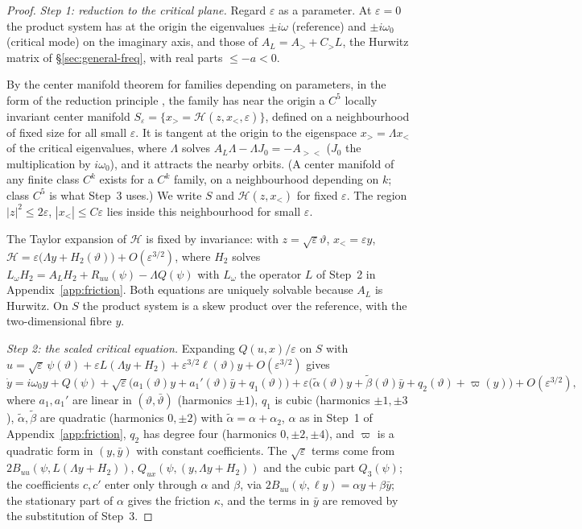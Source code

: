 \documentclass[11pt,reqno]{amsart}
\theoremstyle{plain}
\theoremstyle{definition}
\theoremstyle{remark}
\begin{document}
\begin{proof}
\emph{Step 1: reduction to the critical plane.} Regard $\varepsilon$ as a parameter. At $\varepsilon=0$ the product system has at the
origin the eigenvalues $\pm i\omega$ (reference) and $\pm i\omega_0$ (critical mode) on the imaginary axis, and those of $A_L=A_>+C_>L$, the Hurwitz matrix of \S\ref{sec:general-freq}, with
real parts $\le-a<0$.

By the center manifold theorem for families depending on parameters, in the form of the reduction
principle \cite{Shosh1972,Shosh1975reduction}, the family has near the origin a $C^{5}$ locally invariant center manifold
$S_\varepsilon=\{x_>=\mathcal H(z,x_<,\varepsilon)\}$, defined on a neighbourhood of fixed size for all small $\varepsilon$. It is tangent at the origin
to the eigenspace $x_>=\Lambda x_<$ of the critical eigenvalues, where $\Lambda$ solves $A_L\Lambda-\Lambda J_0=-A_{><}$ ($J_0$ the multiplication by $i\omega_0$), and it attracts the nearby orbits. (A center manifold of any finite
class $C^{k}$ exists for a $C^{k}$ family, on a neighbourhood depending on $k$; class $C^{5}$ is what Step~3 uses.) We write $S$ and $\mathcal H(z,x_<)$
for fixed $\varepsilon$. The region $|z|^{2}\le2\varepsilon$, $|x_<|\le C\varepsilon$ lies inside this neighbourhood for small $\varepsilon$.

The Taylor expansion of $\mathcal H$ is fixed by invariance: with $z=\sqrt\varepsilon \vartheta$, $x_<=\varepsilon y$,
$\mathcal H=\varepsilon\bigl(\Lambda y+H_2(\vartheta)\bigr)+O(\varepsilon^{3/2})$, where $H_2$ solves $L_\omega H_2=A_LH_2+R_{uu}(\psi)-\Lambda Q(\psi)$ with $L_\omega$ the operator $L$ of Step~2 in Appendix~\ref{app:friction}. Both equations are uniquely
solvable because $A_L$ is Hurwitz. On $S$ the product system is a skew product over the reference, with the
two-dimensional fibre $y$.

\emph{Step 2: the scaled critical equation.} Expanding $Q(u,x)/\varepsilon$ on $S$ with
$u=\sqrt\varepsilon\,\psi(\vartheta)+\varepsilon L(\Lambda y+H_2)+\varepsilon^{3/2}\ell(\vartheta)y+O(\varepsilon^{3/2})$ gives
\[
  \dot y=i\omega_0y+Q(\psi)+\sqrt\varepsilon\bigl(a_1(\vartheta)y+a_1'(\vartheta)\bar y+q_1(\vartheta)\bigr)
  +\varepsilon\bigl(\tilde\alpha(\vartheta)y+\tilde\beta(\vartheta)\bar y+q_2(\vartheta)+\varpi(y)\bigr)+O(\varepsilon^{3/2}),
\]
where $a_1,a_1'$ are linear in $(\vartheta,\bar \vartheta)$ (harmonics $\pm1$), $q_1$ is cubic (harmonics $\pm1,\pm3$), $\tilde\alpha,\tilde\beta$ are
quadratic (harmonics $0,\pm2$) with $\tilde\alpha=\alpha+\alpha_2$, $\alpha$ as in Step~1 of Appendix~\ref{app:friction}, $q_2$ has degree four (harmonics
$0,\pm2,\pm4$), and $\varpi$ is a quadratic form in $(y,\bar y)$ with constant coefficients. The $\sqrt\varepsilon$ terms come from
$2B_{uu}(\psi,L(\Lambda y+H_2))$, $Q_{ux}(\psi,(y,\Lambda y+H_2))$ and the cubic part $Q_3(\psi)$; the coefficients $c,c'$ enter only through
$\alpha$ and $\beta$, via $2B_{uu}(\psi,\ell y)=\alpha y+\beta\bar y$; the stationary part of $\alpha$ gives the friction $\kappa$, and the terms in $\bar y$ are removed by the substitution of Step~3.


\end{proof}
\end{document}
